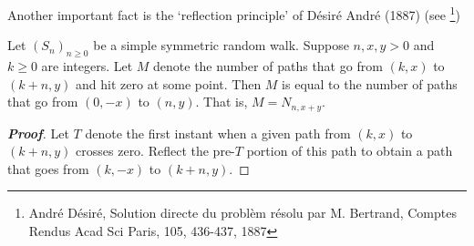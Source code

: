 Another important fact is the `reflection principle' of D\'esir\'e Andr\'e (1887) (see \footnote{Andr\'e D\'esir\'e, Solution directe du probl\`em r\'esolu par M. Bertrand, Comptes Rendus Acad Sci Paris, 105, 436-437, 1887})

\begin{theorem}\label{thm:reflection_principle_simple_symmetric_random_walk}
Let $(S_n)_{n\geq 0}$ be a simple symmetric random walk. Suppose $n,x,y>0$ and $k\geq 0$ are integers. Let $M$ denote the number of paths that go from $(k,x)$ to $(k+n,y)$ and hit zero at some point. Then $M$ is equal to the number of paths that go from $(0,-x)$ to $(n,y)$. That is, $M=N_{n,x+y}$.
\end{theorem}

\begin{proof}[\bf Proof]
Let $T$ denote the first instant when a given path from $(k,x)$ to $(k+n,y)$ crosses zero. Reflect the pre-$T$ portion of this path to obtain a path that goes from $(k,-x)$ to $(k+n,y)$. 

\end{proof}
